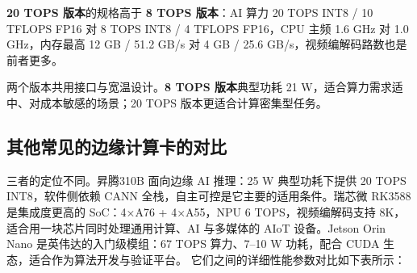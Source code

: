 \textbf{20 TOPS 版本}的规格高于 \textbf{8 TOPS 版本}：AI 算力 20 TOPS
INT8 / 10 TFLOPS FP16 对 8 TOPS INT8 / 4 TFLOPS FP16，CPU 主频 1.6 GHz
对 1.0 GHz，内存最高 12 GB / 51.2 GB/s 对 4 GB / 25.6
GB/s，视频编解码路数也是前者更多。

两个版本共用接口与宽温设计。\textbf{8 TOPS 版本}典型功耗 21
W，适合算力需求适中、对成本敏感的场景；20 TOPS
版本更适合计算密集型任务。

\subsection{其他常见的边缘计算卡的对比}\label{src-book-chapter1-h13}

三者的定位不同。昇腾310B 面向边缘 AI 推理：25 W 典型功耗下提供 20 TOPS
INT8，软件侧依赖 CANN 全栈，自主可控是它主要的适用条件。瑞芯微 RK3588
是集成度更高的 SoC：4×A76 + 4×A55，NPU 6 TOPS，视频编解码支持
8K，适合用一块芯片同时处理通用计算、AI 与多媒体的 AIoT 设备。Jetson Orin
Nano 是英伟达的入门级模组：67 TOPS 算力、7--10 W 功耗，配合 CUDA
生态，适合作为算法开发与验证平台。
它们之间的详细性能参数对比如下表所示：

